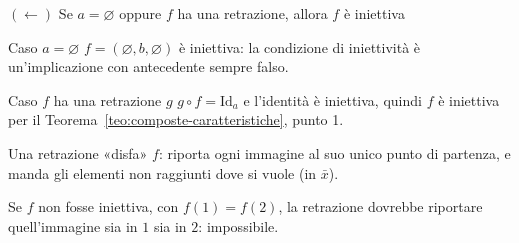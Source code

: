 \begin{concetto}
\begin{dimostrazione}
    \begin{caso}{$(\leftarrow)$ Se $a = \varnothing$ oppure $f$ ha una retrazione, allora $f$ è iniettiva}
        \begin{caso}{Caso $a = \varnothing$}
            $f = (\varnothing, b, \varnothing)$ è iniettiva: la condizione di iniettività è un'implicazione con antecedente sempre falso.
        \end{caso}
        \begin{caso}{Caso $f$ ha una retrazione $g$}
            $g \circ f = \mathrm{Id}_a$ e l'identità è iniettiva, quindi $f$ è iniettiva per il Teorema~\ref{teo:composte-caratteristiche}, punto 1.
        \end{caso}
    \end{caso}
\end{dimostrazione}
\end{concetto}

\begin{spiegazione}
    Una retrazione «disfa» $f$: riporta ogni immagine al suo unico punto di partenza, e manda gli elementi non raggiunti dove si vuole (in $\bar{x}$).
    \begin{center}
    \end{center}
    Se $f$ non fosse iniettiva, con $f(1) = f(2)$, la retrazione dovrebbe riportare quell'immagine sia in $1$ sia in $2$: impossibile.
\end{spiegazione}


